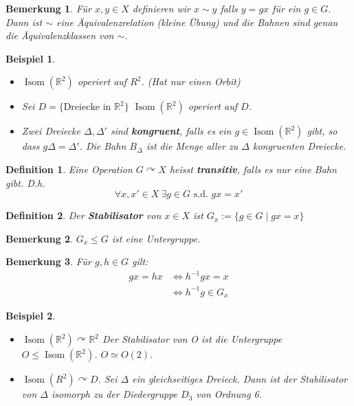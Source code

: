 \documentclass{article}
\theoremstyle{plain}
\newtheorem{definition}{Definition}
\newtheorem{beispiel}{Beispiel}
\newtheorem{bemerkung}{Bemerkung}
\newcommand{\defn}[1]{\textbf{#1}}
\newcommand{\defeq}{:=}
\newcommand{\R}{\mathbb{R}}
\newcommand{\ug}{\leq}
\newcommand{\iso}{\simeq}
\newcommand{\isom}{\mathop\text{Isom}}
\newcommand{\operateson}{\curvearrowright}
\begin{document}
\begin{bemerkung}
    Für $x,y\in X$ definieren wir $x\sim y$ falls $y=gx$ für ein $g\in G$.
    Dann ist $\sim$ eine Äquivalenzrelation (kleine Übung) und die Bahnen sind genau die Äquivalenzklassen von $\sim$.
\end{bemerkung}
\begin{beispiel}
    \begin{itemize}
        \item $\isom(\R^2)$ operiert auf $R^2$. (Hat nur einen Orbit)
        \item Sei $D=\{\text{Dreiecke in }\R^2\}$
        $\isom(\R^2)$ operiert auf $D$.
        \item Zwei Dreiecke $\Delta, \Delta'$ sind \defn{kongruent}, falls es ein $g\in\isom(\R^2)$ gibt, so dass $g\Delta = \Delta'$. Die Bahn $B_\Delta$ ist die Menge aller zu $\Delta$ kongruenten Dreiecke.
    \end{itemize}
\end{beispiel}
\begin{definition}
    Eine Operation $G\operateson X$ heisst \defn{transitiv}, falls es nur eine Bahn gibt. D.h. $$\forall x,x'\in X\ \exists g\in G \text{ s.d. } gx=x'$$
\end{definition}
\begin{definition}
    Der \defn{Stabilisator} von $x\in X$ ist $G_x\defeq \{ g\in G\mid gx=x\}$
\end{definition}
\begin{bemerkung}
    $G_x\ug G$ ist eine Untergruppe.
\end{bemerkung}
\begin{bemerkung}
    Für $g,h\in G$ gilt: 
    \begin{align*}
    gx=hx &\Leftrightarrow h^{-1}gx=x\\
    &\Leftrightarrow h^{-1}g\in G_x
    \end{align*}
\end{bemerkung}

\begin{beispiel}
    \begin{itemize}
        \item $\isom(\R^2)\operateson\R^2$ Der Stabilisator von O ist die Untergruppe $O\ug\isom(\R^2)$. $O\iso O(2)$.
        \item $\isom(R^2)\operateson D$. Sei $\Delta$ ein gleichseitiges Dreieck. Dann ist der Stabilisator von $\Delta$ isomorph zu der Diedergruppe $D_3$ von Ordnung 6.
    \end{itemize}
\end{beispiel}
\end{document}
